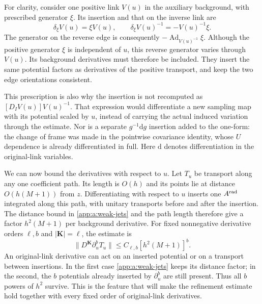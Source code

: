 \documentclass[11pt,a4paper]{article}
\theoremstyle{remark}
\DeclareMathOperator{\Ad}{Ad}
\newcommand{\dd}{\mathrm d}
\begin{document}
For clarity, consider one positive link $V(u)$ in the auxiliary
background, with prescribed generator $\xi$. Its insertion and that
on the inverse link are
\begin{equation}
 \delta_\xi V(u)=\xi V(u),\qquad
 \delta_\xi V(u)^{-1}=-V(u)^{-1}\xi.
\end{equation}
The generator on the reverse edge is consequently
$-\Ad_{V(u)^{-1}}\xi$. Although the positive generator $\xi$
is independent of $u$, this reverse generator varies through $V(u)$.
Its background derivatives must therefore be included. They insert the
same potential factors as derivatives of the positive transport, and
keep the two edge orientations consistent.

This prescription is also why the insertion is not recomputed as
$[D_IV(u)]V(u)^{-1}$. That expression would differentiate a new
sampling map with its potential scaled by $u$, instead of carrying
the actual induced variation through the estimate. Nor is a separate
$g^{-1}\dd g$ insertion added to the one-form: the change of frame
was made in the pointwise covariance identity, whose $U$ dependence
is already differentiated in full. Here $\dd$ denotes differentiation
in the original-link variables.

We can now bound the derivatives with respect to $u$. Let $T_u$ be
transport along any one coefficient path. Its length is $O(h)$ and
its points lie at distance $O(h(M+1))$ from $z$. Differentiating
with respect to $u$ inserts one $A^{\rm rad}$ integrated along
this path, with unitary transports before and after the insertion.
The distance bound in \eqref{app:a:weak-jets} and the path length
therefore give a factor $h^2(M+1)$ per background derivative. For
fixed nonnegative derivative orders $\ell,b$ and
$|\boldsymbol K|=\ell$, the estimate is
\begin{equation}
 \|D^{\boldsymbol K}\partial_u^b T_u\|
       \le C_{\ell,b}[h^2(M+1)]^b.
\end{equation}
An original-link derivative can act on an inserted potential or on a
transport between insertions. In the first case
\eqref{app:a:weak-jets} keeps its distance factor; in the second,
the $b$ potentials already inserted by $\partial_u^b$ are still
present. Thus all $b$ powers of $h^2$ survive. This is the feature
that will make the refinement estimate hold together with every fixed
order of original-link derivatives.
\end{document}
